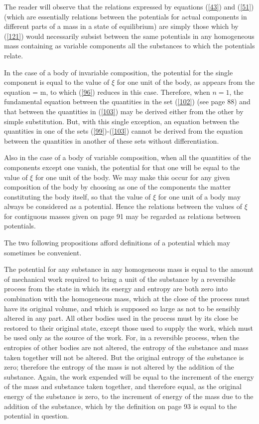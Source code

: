 \documentclass[12pt]{article}
\begin{document}
The reader will observe that the relations expressed by equations (\ref{43}) and (\ref{51}) (which are essentially relations between the potentials for actual components in different parts of a mass in a state of equilibrium) are simply those which by (\ref{121}) would necessarily subsist between the same potentials in any homogeneous mass containing as variable components all the substances to which the potentials relate.


In the case of a body of invariable composition, the potential for the single component is equal to the value of $\xi$ for one unit of the body, as appears from the equation
\eqs \xi= \mu m,  \label{122}\eqe
to which (\ref{96}) reduces in this case. Therefore, when $n = 1$, the fundamental equation between the quantities in the set (\ref{102}) (see page 88) and that between the quantities in (\ref{103}) may be derived either from the other by simple substitution. But, with this single exception, an equation between the quantities in one of the sets (\ref{99})-(\ref{103}) cannot be derived from the equation between the quantities in another of these sets without differentiation.


Also in the case of a body of variable composition, when all the quantities of the components except one vanish, the potential for that one will be equal to the value of $\xi$ for one unit of the body. We may make this occur for any given composition of the body by choosing as one of the components the matter constituting the body itself, so that the value of $\xi$ for one unit of a body may always be considered as a potential. Hence the relations between the values of $\xi$ for contiguous masses given on page 91 may be regarded as relations between potentials.


The two following propositions afford definitions of a potential
which may sometimes be convenient.


The potential for any substance in any homogeneous mass is equal to the amount of mechanical work required to bring a unit of the substance by a reversible process from the state in which its energy and entropy are both zero into combination with the homogeneous mass, which at the close of the process must have its original volume, and which is supposed so large as not to be sensibly altered in any part. All other bodies used in the process must by its close be restored to their original state, except those used to supply the work, which must be used only as the source of the work. For, in a reversible process, when the entropies of other bodies are not altered, the entropy of the substance and mass taken together will not be altered. But the original entropy of the substance is zero; therefore the entropy of the mass is not altered by the addition of the substance. Again, the work expended will be equal to the increment of the energy of the mass and substance taken together, and therefore equal, as the original energy of the substance is zero, to the increment of energy of the mass due to the addition of the substance, which by the definition on page 93 is equal to the potential in question.
\end{document}
